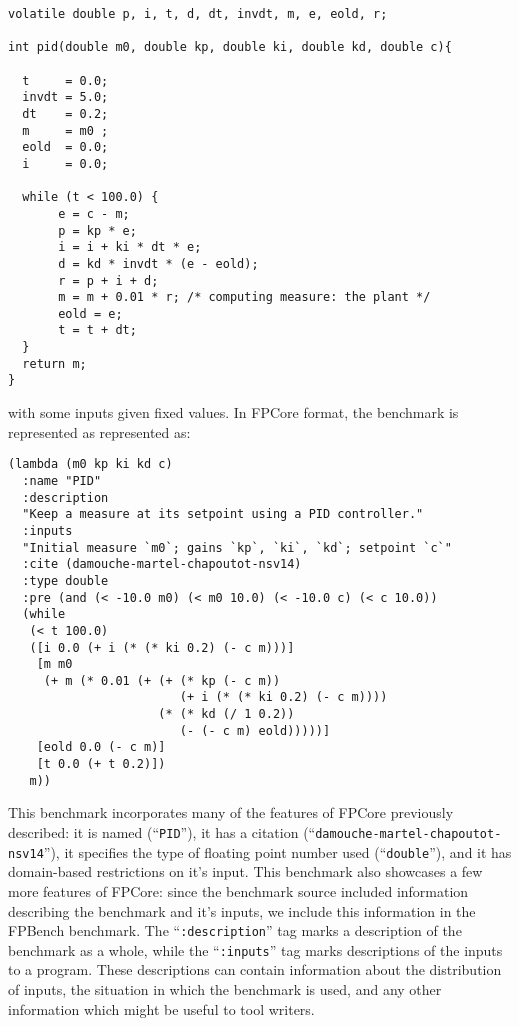 \documentclass[main.tex]{subfiles}
\begin{document}
\begin{verbatim}
volatile double p, i, t, d, dt, invdt, m, e, eold, r; 

int pid(double m0, double kp, double ki, double kd, double c){

  t     = 0.0;
  invdt = 5.0;
  dt    = 0.2;
  m     = m0 ;
  eold  = 0.0;
  i     = 0.0;
  
  while (t < 100.0) {
       e = c - m;
       p = kp * e;
       i = i + ki * dt * e;
       d = kd * invdt * (e - eold);
       r = p + i + d;
       m = m + 0.01 * r; /* computing measure: the plant */
       eold = e;
       t = t + dt;
  }
  return m;
}
\end{verbatim}

with some inputs given fixed values. In FPCore format, the benchmark
is represented as represented as:

\begin{verbatim}
(lambda (m0 kp ki kd c)
  :name "PID"
  :description 
  "Keep a measure at its setpoint using a PID controller."
  :inputs 
  "Initial measure `m0`; gains `kp`, `ki`, `kd`; setpoint `c`"
  :cite (damouche-martel-chapoutot-nsv14)
  :type double
  :pre (and (< -10.0 m0) (< m0 10.0) (< -10.0 c) (< c 10.0))
  (while
   (< t 100.0)
   ([i 0.0 (+ i (* (* ki 0.2) (- c m)))]
    [m m0
     (+ m (* 0.01 (+ (+ (* kp (- c m))
                        (+ i (* (* ki 0.2) (- c m))))
                     (* (* kd (/ 1 0.2))
                        (- (- c m) eold)))))]
    [eold 0.0 (- c m)]
    [t 0.0 (+ t 0.2)])
   m))
\end{verbatim}

This benchmark incorporates many of the features of FPCore previously
described: it is named (``\verb|PID|''), it has a citation
(``\verb|damouche-martel-chapoutot-nsv14|''), it specifies the type of
floating point number used (``\verb|double|''), and it has
domain-based restrictions on it's input. This benchmark also showcases
a few more features of FPCore: since the benchmark source included
information describing the benchmark and it's inputs, we include this
information in the FPBench benchmark. The ``\verb|:description|'' tag
marks a description of the benchmark as a whole, while the
``\verb|:inputs|'' tag marks descriptions of the inputs to a
program. These descriptions can contain information about the
distribution of inputs, the situation in which the benchmark is used,
and any other information which might be useful to tool writers.
\end{document}
